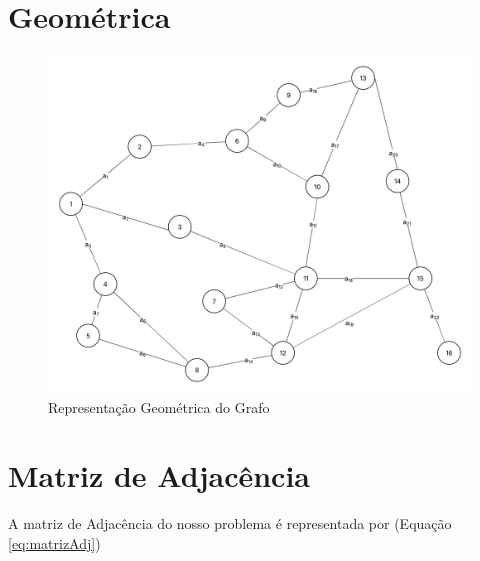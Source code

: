 	\section{Geométrica}\label{sec:geometrica}
	\begin{figure}[!htb]%
		\caption{Representação Geométrica do Grafo}%
		\label{fig:grafGeometrico}%
		\includegraphics[width=1\textwidth,angle=0]{figuras/grafoGeometrico.png}%
	\end{figure}
	
	
	\section{Matriz de Adjacência}\label{sec:matriz}
	
	A matriz de Adjacência do nosso problema é representada por (Equação \ref{eq:matrizAdj})
	
